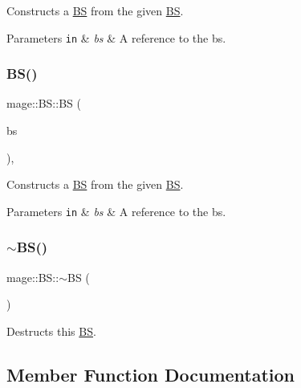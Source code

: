 Constructs a \hyperlink{classmage_1_1_b_s}{BS} from the given \hyperlink{classmage_1_1_b_s}{BS}.


\begin{DoxyParams}[1]{Parameters}
\mbox{\tt in}  & {\em bs} & A reference to the bs. \\
\hline
\end{DoxyParams}
\hypertarget{classmage_1_1_b_s_a24384edc5e7bfee4fae6d0616b39be2c}{}\label{classmage_1_1_b_s_a24384edc5e7bfee4fae6d0616b39be2c} 
\subsubsection{\texorpdfstring{B\+S()}{BS()}\hspace{0.1cm}{\footnotesize\ttfamily [8/8]}}
{\footnotesize\ttfamily mage\+::\+B\+S\+::\+BS (\begin{DoxyParamCaption}\item[{\hyperlink{classmage_1_1_b_s}{BS} \&\&}]{bs }\end{DoxyParamCaption})\hspace{0.3cm}{\ttfamily [default]}, {\ttfamily [noexcept]}}

Constructs a \hyperlink{classmage_1_1_b_s}{BS} from the given \hyperlink{classmage_1_1_b_s}{BS}.


\begin{DoxyParams}[1]{Parameters}
\mbox{\tt in}  & {\em bs} & A reference to the bs. \\
\hline
\end{DoxyParams}
\hypertarget{classmage_1_1_b_s_a111f60f8ab53c7497ff7aaa743619829}{}\label{classmage_1_1_b_s_a111f60f8ab53c7497ff7aaa743619829} 
\subsubsection{\texorpdfstring{$\sim$\+B\+S()}{~BS()}}
{\footnotesize\ttfamily mage\+::\+B\+S\+::$\sim$\+BS (\begin{DoxyParamCaption}{ }\end{DoxyParamCaption})\hspace{0.3cm}{\ttfamily [default]}}

Destructs this \hyperlink{classmage_1_1_b_s}{BS}. 

\subsection{Member Function Documentation}
\hypertarget{classmage_1_1_b_s_acd3a412603c22365a3892a6aae8c52bc}{}\label{classmage_1_1_b_s_acd3a412603c22365a3892a6aae8c52bc} 

